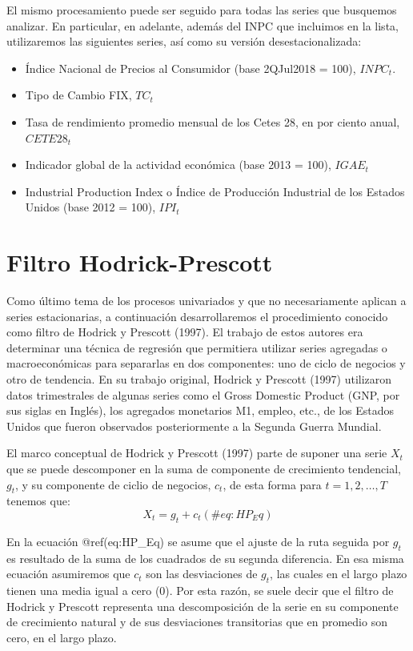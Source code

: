 \documentclass[
]{book}
\begin{document}
El mismo procesamiento puede ser seguido para todas las series que busquemos analizar. En particular, en adelante, además del INPC que incluimos en la lista, utilizaremos las siguientes series, así como su versión desestacionalizada:

\begin{itemize}
    \item Índice Nacional de Precios al Consumidor (base 2QJul2018 = 100), $INPC_t$.
    \item Tipo de Cambio FIX, $TC_t$
    \item Tasa de rendimiento promedio mensual de los Cetes 28, en por ciento anual, $CETE28_t$
    \item Indicador global de la actividad económica (base 2013 = 100), $IGAE_t$
    \item Industrial Production Index o Índice de Producción Industrial de los Estados Unidos (base 2012 = 100), $IPI_t$
\end{itemize}

\hypertarget{filtro-hodrick-prescott}{%
\section{Filtro Hodrick-Prescott}\label{filtro-hodrick-prescott}}

Como último tema de los procesos univariados y que no necesariamente aplican a series estacionarias, a continuación desarrollaremos el procedimiento conocido como filtro de Hodrick y Prescott (1997). El trabajo de estos autores era determinar una técnica de regresión que permitiera utilizar series agregadas o macroeconómicas para separarlas en dos componentes: uno de ciclo de negocios y otro de tendencia. En su trabajo original, Hodrick y Prescott (1997) utilizaron datos trimestrales de algunas series como el Gross Domestic Product (GNP, por sus siglas en Inglés), los agregados monetarios M1, empleo, etc., de los Estados Unidos que fueron observados posteriormente a la Segunda Guerra Mundial.

El marco conceptual de Hodrick y Prescott (1997) parte de suponer una serie \(X_t\) que se puede descomponer en la suma de componente de crecimiento tendencial, \(g_t\), y su componente de ciclio de negocios, \(c_t\), de esta forma para \(t = 1, 2, \ldots, T\) tenemos que:
\begin{equation}
    X_t = g_t + c_t
    (\#eq:HP_Eq)
\end{equation}

En la ecuación @ref(eq:HP\_Eq) se asume que el ajuste de la ruta seguida por \(g_t\) es resultado de la suma de los cuadrados de su segunda diferencia. En esa misma ecuación asumiremos que \(c_t\) son las desviaciones de \(g_t\), las cuales en el largo plazo tienen una media igual a cero (0). Por esta razón, se suele decir que el filtro de Hodrick y Prescott representa una descomposición de la serie en su componente de crecimiento natural y de sus desviaciones transitorias que en promedio son cero, en el largo plazo.
\end{document}
